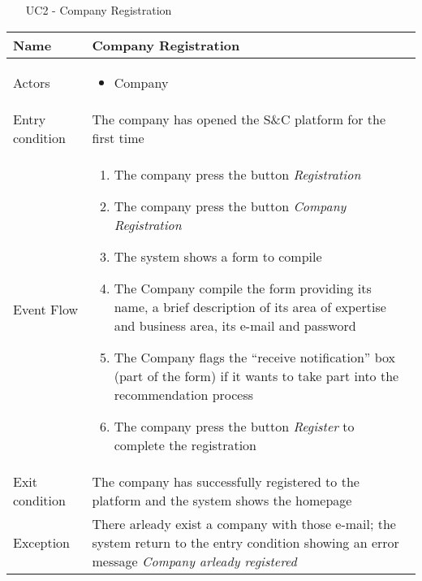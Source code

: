 			
		
			
			\begin{table} [H]
				\centering
					\begin{itemize}
					\item [UC2] - Company Registration
				\end{itemize}
				\begin{tabular}{|| P{7.5cm} | P{7.5cm} ||}
					\hline
					Name & Company Registration \\
					\hline
					Actors & \parbox{5cm}{\begin{itemize}
							\item Company
						\end{itemize}
					} \\
					\hline
					Entry condition & The company has opened the S\&C platform for the first time \\
					\hline
					Event Flow & \parbox{5cm}{\begin{enumerate}[label=\alpha]
							\item The company press the button \textit{Registration}
							\item The company press the button \textit{Company Registration}
							\item The system shows a form to compile
							\item The Company compile the form 
							providing its name, a brief description 
							of its area of expertise and business 
							area, its e-mail and password
							\item The Company flags the “receive 
							notification” box (part of the form) if it 
							wants to take part into the recommendation process
							\item The company press the button 
							\textit{Register} to complete the 
							registration
					\end{enumerate}} \\
					\hline 
					Exit condition & The company has successfully registered 
					to the platform and the system shows the 
					homepage \\
					\hline
					Exception & There arleady exist a company with 
					those e-mail; the system return to 
					the entry condition showing an 
					error message \textit{Company arleady 
						registered} \\
					\hline
				\end{tabular}
			\end{table}
			
		
			
